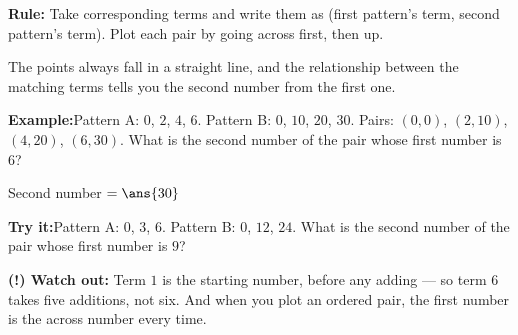 \documentclass[12pt]{article}
\begin{document}
\begin{formulabox}
\textbf{Rule:} Take corresponding terms and write them as (first pattern's
term, second pattern's term). Plot each pair by going across first, then up.\par
The points always fall in a straight line, and the relationship between the
matching terms tells you the second number from the first one.
\end{formulabox}
\begin{examplebox}
\textbf{Example:}\quad Pattern A: $0$, $2$, $4$, $6$. Pattern B: $0$, $10$,
$20$, $30$. Pairs: $(0,0)$, $(2,10)$, $(4,20)$, $(6,30)$. What is the second
number of the pair whose first number is $6$?

Second number $= \ans{30}$
\end{examplebox}
\begin{tryitbox}
\textbf{Try it:}\quad Pattern A: $0$, $3$, $6$. Pattern B: $0$, $12$, $24$.
What is the second number of the pair whose first number is $9$?\\[2pt]
\end{tryitbox}

\begin{watchoutbox}
\textbf{(!) Watch out:} Term $1$ is the starting number, before any adding ---
so term $6$ takes five additions, not six. And when you plot an ordered pair,
the first number is the across number every time.
\end{watchoutbox}
\end{document}
